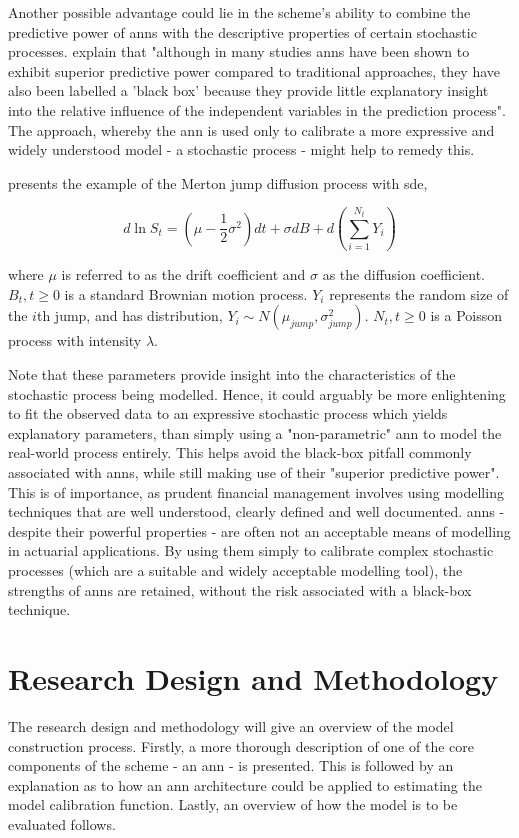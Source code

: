 \documentclass[11pt,oneside,openany,a4paper,english, report, goldenblock
]{usthesis}
\begin{document}
Another possible advantage could lie in the scheme's ability to combine the predictive power of \acrshort{ann}s with the descriptive properties of certain stochastic processes. \citet{Olden} explain that "although in many studies \acrshort{ann}s have been shown to exhibit superior predictive power compared to traditional approaches, they have also been labelled a 'black box' because they provide little explanatory insight into the relative influence of the independent variables in the prediction process". The approach, whereby the \acrshort{ann} is used only to calibrate a more expressive and widely understood model - a stochastic process - might help to remedy this.


\citet{Mongwe} presents the example of the Merton jump diffusion process with \acrshort{sde},

\begin{equation}
	d \ln{S_t}= \left( \mu - \frac{1}{2} \sigma^2 \right )dt+\sigma dB +d \left( \sum_{i=1}^{N_t} Y_i \right )
\end{equation}

where $ \mu $  is referred to as the drift coefficient and $ \sigma $ as the diffusion coefficient. $ B_{t}, t\geq 0$ is a standard Brownian motion process. $Y_i$ represents the random size of the $i$th jump, and has distribution, $Y_i \sim N \left( \mu_{jump}, \sigma_{jump}^2 \right )$. $N_t, t \geq 0$ is a Poisson process with intensity $\lambda$.


Note that these parameters provide insight into the characteristics of the stochastic process being modelled. Hence, it could arguably be more enlightening to fit the observed data to an expressive stochastic process which yields explanatory parameters, than simply using a "non-parametric" \acrshort{ann} to model the real-world process entirely. This helps avoid the black-box pitfall commonly associated with \acrshort{ann}s, while still making use of their "superior predictive power". This is of importance, as prudent financial management involves using modelling techniques that are well understood, clearly defined and well documented. \acrshort{ann}s - despite their powerful properties - are often not an acceptable means of modelling in actuarial applications. By using them simply to calibrate complex stochastic processes (which are a suitable and widely acceptable modelling tool), the strengths of \acrshort{ann}s are retained, without the risk associated with a black-box technique.

\section{Research Design and Methodology}
The research design and methodology will give an overview of the model construction process. Firstly, a more thorough description of one of the core components of the scheme - an \acrshort{ann} - is presented. This is followed by an explanation as to how an \acrshort{ann} architecture could be applied to estimating the model calibration function. Lastly, an overview of how the model is to be evaluated follows.
\end{document}
